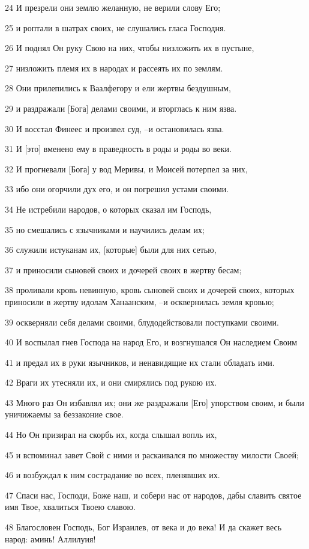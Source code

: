 \par 24 И презрели они землю желанную, не верили слову Его;
\par 25 и роптали в шатрах своих, не слушались гласа Господня.
\par 26 И поднял Он руку Свою на них, чтобы низложить их в пустыне,
\par 27 низложить племя их в народах и рассеять их по землям.
\par 28 Они прилепились к Ваалфегору и ели жертвы бездушным,
\par 29 и раздражали [Бога] делами своими, и вторглась к ним язва.
\par 30 И восстал Финеес и произвел суд, --и остановилась язва.
\par 31 И [это] вменено ему в праведность в роды и роды во веки.
\par 32 И прогневали [Бога] у вод Меривы, и Моисей потерпел за них,
\par 33 ибо они огорчили дух его, и он погрешил устами своими.
\par 34 Не истребили народов, о которых сказал им Господь,
\par 35 но смешались с язычниками и научились делам их;
\par 36 служили истуканам их, [которые] были для них сетью,
\par 37 и приносили сыновей своих и дочерей своих в жертву бесам;
\par 38 проливали кровь невинную, кровь сыновей своих и дочерей своих, которых приносили в жертву идолам Ханаанским, --и осквернилась земля кровью;
\par 39 оскверняли себя делами своими, блудодействовали поступками своими.
\par 40 И воспылал гнев Господа на народ Его, и возгнушался Он наследием Своим
\par 41 и предал их в руки язычников, и ненавидящие их стали обладать ими.
\par 42 Враги их утесняли их, и они смирялись под рукою их.
\par 43 Много раз Он избавлял их; они же раздражали [Его] упорством своим, и были уничижаемы за беззаконие свое.
\par 44 Но Он призирал на скорбь их, когда слышал вопль их,
\par 45 и вспоминал завет Свой с ними и раскаивался по множеству милости Своей;
\par 46 и возбуждал к ним сострадание во всех, пленявших их.
\par 47 Спаси нас, Господи, Боже наш, и собери нас от народов, дабы славить святое имя Твое, хвалиться Твоею славою.
\par 48 Благословен Господь, Бог Израилев, от века и до века! И да скажет весь народ: аминь! Аллилуия!

